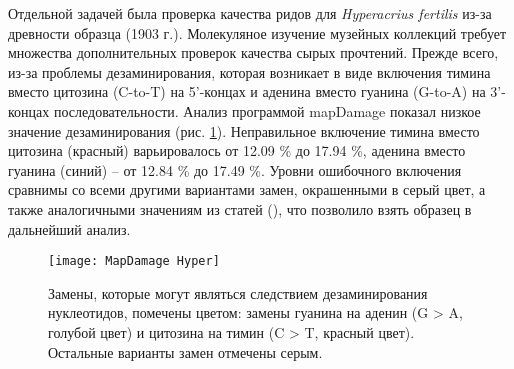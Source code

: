 

Отдельной задачей была проверка качества ридов для \textit{Hyperacrius fertilis} из-за древности образца (1903 г.). Молекуляное изучение музейных коллекций требует множества дополнительных проверок качества сырых прочтений. Прежде всего, из-за проблемы дезаминирования, которая возникает в виде включения тимина вместо цитозина (C-to-T) на 5'-концах и аденина вместо гуанина (G-to-A) на 3'-концах последовательности. Анализ программой mapDamage показал низкое значение дезаминирования (рис. \ref{MapDamage}). Неправильное включение тимина вместо цитозина (красный) варьировалось от 12.09 \% до 17.94 \%, аденина вместо гуанина (синий) -- от 12.84 \% до 17.49 \%. Уровни ошибочного включения сравнимы со всеми другими вариантами замен, окрашенными в серый цвет, а также аналогичными значениям из статей (\cite{Molto2017}), что позволило взять образец в дальнейший анализ. 


\begin{figure}[h!]
	\begin{center}
		\texttt{[image: MapDamage Hyper]}
	\end{center}
	\caption{Замены, которые могут являться следствием дезаминирования нуклеотидов, помечены цветом: замены гуанина на аденин (G > A, голубой цвет) и цитозина на тимин (C > T, красный цвет). Остальные варианты замен отмечены серым.}\label{MapDamage}
\end{figure}


